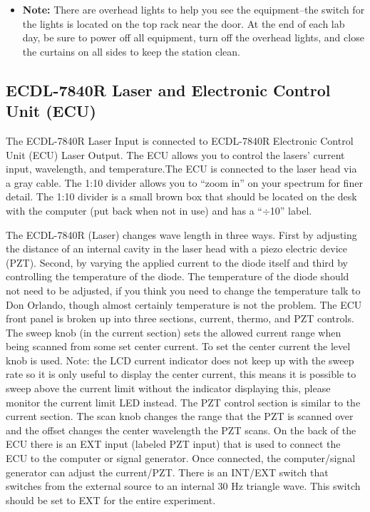 \documentclass{../lab}
\begin{document}
\begin{itemize}
    \item \textbf{Note:} There are overhead lights to help you see the equipment--the switch for the lights is located on the top rack near the door. At the end of each lab day, be sure to power off all equipment, turn off the overhead lights, and close the curtains on all sides to keep the station clean.

\end{itemize}

\subsection{ECDL-7840R Laser and Electronic Control Unit (ECU)}
\label{subsec:ECDL7840RLaser}

The ECDL-7840R Laser Input is connected to ECDL-7840R Electronic Control Unit (ECU) Laser Output. The ECU allows you to control the lasers' current input, wavelength, and temperature.The ECU is connected to the laser head via a gray cable. The 1:10 divider allows you to ``zoom in'' on your spectrum for finer detail. The 1:10 divider is a small brown box that should be located on the desk with the computer (put back when not in use) and has a ``$\div$10'' label.

The ECDL-7840R (Laser) changes wave length in three ways. First by adjusting the distance of an internal cavity in the laser head with a piezo electric device (PZT). Second, by varying the applied current to the diode itself and third by controlling the temperature of the diode. The temperature of the diode should not need to be adjusted, if you think you need to change the temperature talk to Don Orlando, though almost certainly temperature is not the problem. The ECU front panel is broken up into three sections, current, thermo, and PZT controls. The sweep knob (in the current section) sets the allowed current range when being scanned from some set center current. To set the center current the level knob is used. Note: the LCD current indicator does not keep up with the sweep rate so it is only useful to display the center current, this means it is possible to sweep above the current limit without the indicator displaying this, please monitor the current limit LED instead. The PZT control section is similar to the current section. The scan knob changes the range that the PZT is scanned over and the offset changes the center wavelength the PZT scans. On the back of the ECU there is an EXT input (labeled PZT input) that is used to connect the ECU to the computer or signal generator. Once connected, the computer/signal generator can adjust the current/PZT. There is an INT/EXT switch that switches from the external source to an internal 30 Hz triangle wave. This switch should be set to EXT for the entire experiment.
\end{document}
